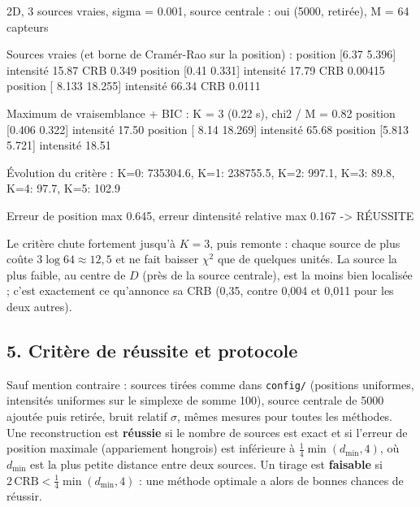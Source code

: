 \documentclass[
  french,
]{article}
\newenvironment{Shaded}{}{}
\newcommand{\NormalTok}[1]{#1}
\begin{document}
\begin{Shaded}
\begin{Highlighting}[]
\NormalTok{2D, 3 sources vraies, sigma = 0.001, source centrale : oui (5000, retirée), M = 64 capteurs}

\NormalTok{Sources vraies (et borne de Cramér{-}Rao sur la position) :}
\NormalTok{  position [6.37  5.396]  intensité   15.87  CRB 0.349}
\NormalTok{  position [0.41  0.331]  intensité   17.79  CRB 0.00415}
\NormalTok{  position [ 8.133 18.255]  intensité   66.34  CRB 0.0111}

\NormalTok{Maximum de vraisemblance + BIC : K = 3 (0.22 s), chi2 / M = 0.82}
\NormalTok{  position [0.406 0.322]  intensité   17.50}
\NormalTok{  position [ 8.14  18.269]  intensité   65.68}
\NormalTok{  position [5.813 5.721]  intensité   18.51}

\NormalTok{Évolution du critère : K=0: 735304.6, K=1: 238755.5, K=2: 997.1, K=3: 89.8,}
\NormalTok{                       K=4: 97.7, K=5: 102.9}

\NormalTok{Erreur de position max 0.645, erreur d\textquotesingle{}intensité relative max 0.167 {-}\textgreater{} RÉUSSITE}
\end{Highlighting}
\end{Shaded}

Le critère chute fortement jusqu'à \(K = 3\), puis remonte : chaque
source de plus coûte \(3\log 64\approx 12{,}5\) et ne fait baisser
\(\chi^2\) que de quelques unités. La source la plus faible, au centre
de \(D\) (près de la source centrale), est la moins bien localisée ;
c'est exactement ce qu'annonce sa CRB (0,35, contre 0,004 et 0,011 pour
les deux autres).

\subsection{5. Critère de réussite et
protocole}\label{crituxe8re-de-ruxe9ussite-et-protocole}

Sauf mention contraire : sources tirées comme dans \texttt{config/}
(positions uniformes, intensités uniformes sur le simplexe de somme
100), source centrale de 5000 ajoutée puis retirée, bruit relatif
\(\sigma\), mêmes mesures pour toutes les méthodes. Une reconstruction
est \textbf{réussie} si le nombre de sources est exact et si l'erreur de
position maximale (appariement hongrois) est inférieure à
\(\tfrac14\min(d_{\min}, 4)\), où \(d_{\min}\) est la plus petite
distance entre deux sources. Un tirage est \textbf{faisable} si
\(2\,\mathrm{CRB} < \tfrac14\min(d_{\min}, 4)\) : une méthode optimale a
alors de bonnes chances de réussir.
\end{document}
